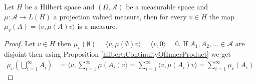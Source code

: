 \begin{prop}\label{hilbert:PointwiseEvaluationOfProjectionMeasure}Let $H$ be a Hilbert space and $(\Omega, \mathcal{A})$ be a measurable space and $\mu : \mathcal{A} \to L(H)$ a projection valued measure, then
for every $v \in H$ the map $\mu_v(A) = \langle v, \mu(A) v \rangle$ is a measure.
\end{prop}
\begin{proof}
Let $v \in H$ then $\mu_v(\emptyset) = \langle v , \mu(\emptyset) v \rangle = \langle v, 0 \rangle = 0$.  If $A_1, A_2, \dots \in \mathcal{A}$ are disjoint
then using Proposition \ref{hilbert:ContinuityOfInnerProduct} we get
\begin{align*}
\mu_v(\bigcup_{i=1}^\infty A_i) &= \langle v , \sum_{i=1}^\infty \mu(A_i)v \rangle = \sum_{i=1}^\infty \langle v , \mu(A_i)v \rangle = \sum_{i=1}^\infty \mu_v (A_i)
\end{align*}
\end{proof}

